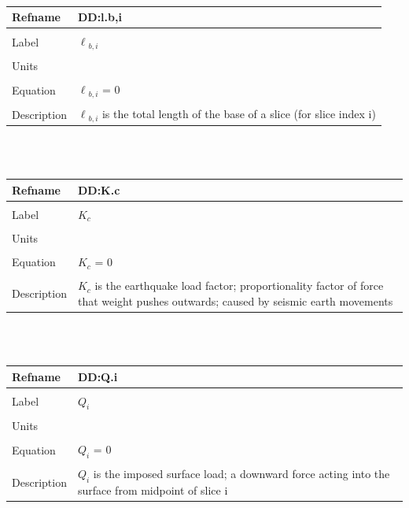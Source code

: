 \documentclass[12pt]{article}
\begin{document}
~\newline
\noindent \begin{minipage}{\textwidth}
\begin{tabular}{p{} p{}}
\toprule \textbf{Refname} & \textbf{DD:l.b,i}
\label{DD:l.b,i}
\\ \midrule \\
Label & $\ell{}_{b,i}$
\\ \midrule \\
Units & 
\\ \midrule \\
Equation & $\ell{}_{b,i}$ = $0$
\\ \midrule \\
Description & $\ell{}_{b,i}$ is the total length of the base of a slice (for slice index i)
\\ \bottomrule \end{tabular}
\end{minipage}\\
~\newline
\noindent \begin{minipage}{\textwidth}
\begin{tabular}{p{} p{}}
\toprule \textbf{Refname} & \textbf{DD:K.c}
\label{DD:K.c}
\\ \midrule \\
Label & $K_{c}$
\\ \midrule \\
Units & 
\\ \midrule \\
Equation & $K_{c}$ = $0$
\\ \midrule \\
Description & $K_{c}$ is the earthquake load factor; proportionality factor of force that weight pushes outwards; caused by seismic earth movements
\\ \bottomrule \end{tabular}
\end{minipage}\\
~\newline
\noindent \begin{minipage}{\textwidth}
\begin{tabular}{p{} p{}}
\toprule \textbf{Refname} & \textbf{DD:Q.i}
\label{DD:Q.i}
\\ \midrule \\
Label & $Q_{i}$
\\ \midrule \\
Units & 
\\ \midrule \\
Equation & $Q_{i}$ = $0$
\\ \midrule \\
Description & $Q_{i}$ is the imposed surface load; a downward force acting into the surface from midpoint of slice i
\\ \bottomrule \end{tabular}
\end{minipage}\\
\end{document}
